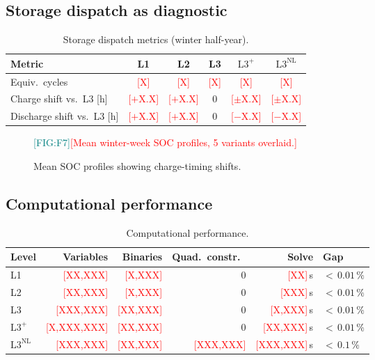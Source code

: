 \documentclass[review,3p]{elsarticle}
\newcommand{\placeholder}[1]{\textcolor{red}{[#1]}}
\newcommand{\Lplus}{\mathrm{L3}^{+}}
\newcommand{\Lnl}{\mathrm{L3}^{\mathrm{NL}}}
\newcommand{\figref}[1]{\textcolor{teal}{[FIG:#1]}}
\begin{document}
\subsection{Storage dispatch as diagnostic}
\label{sec:results_storage}

\begin{table}[htbp]
\centering
\caption{Storage dispatch metrics (winter half-year).}
\label{tab:storage}
\small
\begin{tabular}{@{} l c c c c c @{}}
\toprule
Metric & L1 & L2 & L3 & $\Lplus$ & $\Lnl$ \\
\midrule
Equiv.\ cycles
  & \placeholder{X} & \placeholder{X}
  & \placeholder{X} & \placeholder{X}
  & \placeholder{X} \\
Charge shift vs.\ L3 [h]
  & \placeholder{$+$X.X} & \placeholder{$+$X.X}
  & 0 & \placeholder{$\pm$X.X}
  & \placeholder{$\pm$X.X} \\
Discharge shift vs.\ L3 [h]
  & \placeholder{$+$X.X} & \placeholder{$+$X.X}
  & 0 & \placeholder{$-$X.X}
  & \placeholder{$-$X.X} \\
\bottomrule
\end{tabular}
\end{table}

\begin{figure}[htbp]
  \centering
  \figref{F7}\quad\placeholder{Mean winter-week SOC profiles, 5
  variants overlaid.}
  \caption{Mean SOC profiles showing charge-timing shifts.}
  \label{fig:soc_winterweek}
\end{figure}

\subsection{Computational performance}
\label{sec:results_computation}

\begin{table}[htbp]
\centering
\caption{Computational performance.}
\label{tab:computation}
\small
\begin{tabular}{@{} l r r r r l @{}}
\toprule
Level & Variables & Binaries & Quad.\ constr.\
  & Solve & Gap \\
\midrule
L1      & \placeholder{XX,XXX}    & \placeholder{X,XXX}
        & 0 & \placeholder{XX}\,s    & ${<}\,0.01\,\%$ \\
L2      & \placeholder{XX,XXX}    & \placeholder{X,XXX}
        & 0 & \placeholder{XXX}\,s   & ${<}\,0.01\,\%$ \\
L3      & \placeholder{XXX,XXX}   & \placeholder{XX,XXX}
        & 0 & \placeholder{X,XXX}\,s & ${<}\,0.01\,\%$ \\
$\Lplus$ & \placeholder{X,XXX,XXX} & \placeholder{XX,XXX}
        & 0 & \placeholder{XX,XXX}\,s & ${<}\,0.01\,\%$ \\
$\Lnl$  & \placeholder{XXX,XXX}   & \placeholder{XX,XXX}
        & \placeholder{XXX,XXX}
        & \placeholder{XXX,XXX}\,s & ${<}\,0.1\,\%$ \\
\bottomrule
\end{tabular}
\end{table}
\end{document}
